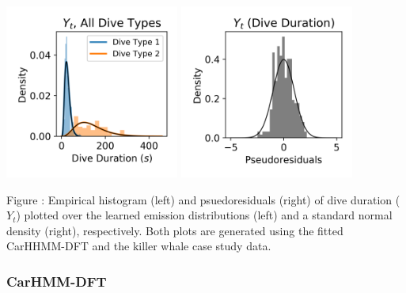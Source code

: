 \documentclass{article}
\begin{document}
        \begin{center}
        \includegraphics[width=2.25in]{../Plots/CarHHMM1_empirical_hist_dive_duration.png}
        \includegraphics[width=2.25in]{../Plots/CarHHMM1_psedoresids_Dive_Duration.png}
        \end{center}
        
        \noindent Figure : Empirical histogram (left) and psuedoresiduals (right) of dive duration ($Y_{t}$) plotted over the learned emission distributions (left) and a standard normal density (right), respectively. Both plots are generated using the fitted CarHHMM-DFT and the killer whale case study data.
        \addtocounter{fignum}{1}
        
        \subsubsection{CarHMM-DFT}
        
\end{document}
